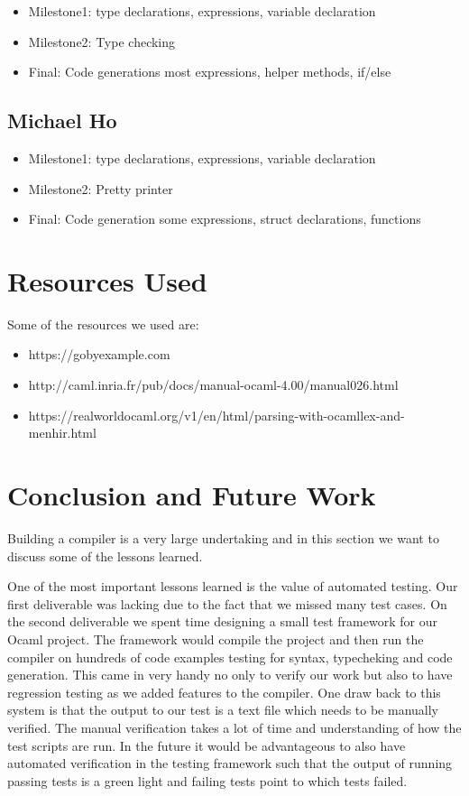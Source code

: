 \documentclass{article}
\begin{document}
\begin{itemize}
\item Milestone1: type declarations, expressions, variable declaration
\item Milestone2: Type checking
\item Final: Code generations most expressions, helper methods, if/else
\end{itemize}
	
\subsection{Michael Ho}
\begin{itemize}
\item Milestone1: type declarations, expressions, variable declaration
\item Milestone2: Pretty printer
\item Final: Code generation some expressions, struct declarations, functions
\end{itemize}

\section{Resources Used}
Some of the resources we used are: 

\begin{itemize}
\item https://gobyexample.com  
\item http://caml.inria.fr/pub/docs/manual-ocaml-4.00/manual026.html
\item https://realworldocaml.org/v1/en/html/parsing-with-ocamllex-and-menhir.html
\end{itemize}


\section{Conclusion and Future Work}
Building a compiler is a very large undertaking and in this section we want to discuss some of the lessons learned.


One of the most important lessons learned is the value of automated testing. Our first deliverable was lacking due to the fact that we missed many test cases. On the second deliverable we spent time designing a small test framework for our Ocaml project. The framework would compile the project and then run the compiler on hundreds of code examples testing for syntax, typecheking and code generation. This came in very handy no only to verify our work but also to have regression testing as we added features to the compiler. One draw back to this system is that the output to our test is a text file which needs to be manually verified. The manual verification takes a lot of time and understanding of how the test scripts are run. In the future it would be advantageous to also have automated verification in the testing framework such that the output of running passing tests is a green light and failing tests point to which tests failed. 
\end{document}
